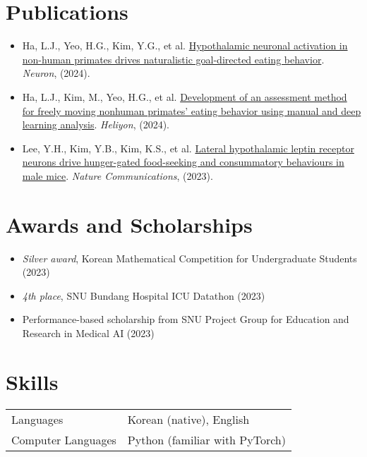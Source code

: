 \documentclass[11pt, a4paper]{article}
\begin{document}
\section*{Publications}
\begin{itemize}[leftmargin=*, noitemsep, topsep=0pt, label=$\cdot$]
    \item Ha, L.J., Yeo, H.G., Kim, Y.G., et al. \href{https://doi.org/10.1016/j.neuron.2024.03.029}{Hypothalamic neuronal activation in non-human primates drives naturalistic goal-directed eating behavior}. {\it Neuron}, (2024). 
    \item Ha, L.J., Kim, M., Yeo, H.G., et al. \href{https://doi.org/10.1016/j.heliyon.2024.e25561}{Development of an assessment method for freely moving nonhuman primates' eating behavior using manual and deep learning analysis}. {\it Heliyon}, (2024). 
    \item Lee, Y.H., Kim, Y.B., Kim, K.S., et al. \href{https://doi.org/10.1038/s41467-023-37044-4}{Lateral hypothalamic leptin receptor neurons drive hunger-gated food-seeking and consummatory behaviours in male mice}. {\it Nature Communications}, (2023). 
\end{itemize}


\section*{Awards and Scholarships}
\begin{itemize}[leftmargin=*, noitemsep, topsep=0pt, label=$\cdot$]
    \item \textit{Silver award}, Korean Mathematical Competition for Undergraduate Students (2023)
    \item \textit{4th place}, SNU Bundang Hospital ICU Datathon (2023)
    \item Performance-based scholarship from SNU Project Group for Education and Research in Medical AI (2023)
\end{itemize}


\section*{Skills}
\begin{tabular}{ll}
    Languages & Korean (native), English \\
    Computer Languages & Python (familiar with PyTorch)
\end{tabular}
\end{document}
